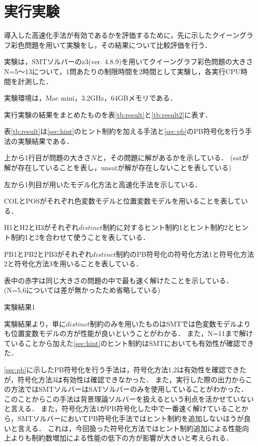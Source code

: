 \chapter{実行実験}

導入した高速化手法が有効であるかを評価するために，先に示したクイーングラフ彩色問題を用いて実験をし，その結果について比較評価を行う．

実験は，SMTソルバーのz3(ver. 4.8.9)を用いてクイーングラフ彩色問題の大きさN=5〜13について，1問あたりの制限時間を2時間として実験し，各実行CPU時間を計測した．

実験環境は，Mac mini，3.2GHz，64GBメモリである．

実行実験の結果をまとめたものを表\ref{tb:result}と\ref{tb:result2}に表す．

表\ref{tb:result}は\ref{sec:hint}のヒント制約を加える手法と\ref{sec:pb}のPB符号化を行う手法の実験結果である．

上から1行目が問題の大きさ$N$と，その問題に解があるかを示している．
(satが解が存在していることを表し，unsatが解が存在しないことを表している)

左から1列目が用いたモデル化方法と高速化手法を示している．

COLとPOSがそれぞれ色変数モデルと位置変数モデルを用いることを表している．

H1とH2とH3がそれぞれ$distinct$制約に対するヒント制約1とヒント制約2とヒント制約1と2を合わせて使うことを表している．

PB1とPB2とPB3がそれぞれ$distinct$制約のPB符号化の符号化方法1と符号化方法2と符号化方法3を用いることを表している．

表中の赤字は同じ大きさの問題の中で最も速く解けたことを示している．
(N=5,6については差が無かったため省略している)

\begin{table}[htb]
    \caption{実験結果1}
{\tiny \label{tb:result}}
\end{table}

実験結果より，単に$distinct$制約のみを用いたものはSMTでは色変数モデルよりも位置変数モデルの方が性能が良いということがわかる．
また，N=11まで解けていることから加えた\ref{sec:hint}のヒント制約はSMTにおいても有効性が確認できた．

\ref{sec:pb}に示したPB符号化を行う手法は，符号化方法1,2は有効性を確認できたが，符号化方法3は有効性は確認できなかった．
また，実行した際の出力からこの方法ではSMTソルバーはSATソルバーのみを使用していることがわかった．
このことからこの手法は背景理論ソルバーを扱えるという利点を活かせていないと言える．
また，符号化方法1がPB符号化した中で一番速く解けていることから，SMTソルバーにおいてPB符号化手法ではヒント制約を追加しないほうが良いと言える．
これは，今回扱った符号化方法ではヒント制約追加による性能向上よりも制約数増加による性能の低下の方が影響が大きいと考えられる．

